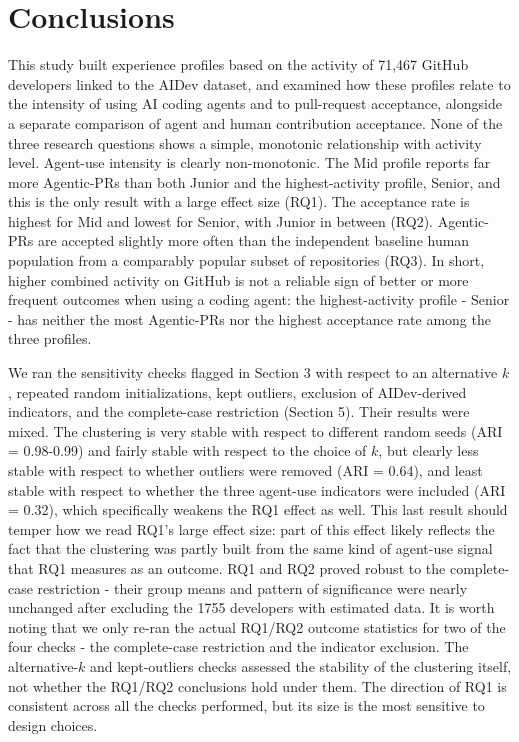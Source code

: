 \section{Conclusions\label{sec:conclusions}}
This study built experience profiles based on the activity of 71,467 GitHub developers linked to the AIDev dataset, and examined how these profiles relate to the intensity of using AI coding agents and to pull-request acceptance, alongside a separate comparison of agent and human contribution acceptance. None of the three research questions shows a simple, monotonic relationship with activity level. Agent-use intensity is clearly non-monotonic. The Mid profile reports far more Agentic-PRs than both Junior and the highest-activity profile, Senior, and this is the only result with a large effect size (RQ1). The acceptance rate is highest for Mid and lowest for Senior, with Junior in between (RQ2). Agentic-PRs are accepted slightly more often than the independent baseline human population from a comparably popular subset of repositories (RQ3). In short, higher combined activity on GitHub is not a reliable sign of better or more frequent outcomes when using a coding agent: the highest-activity profile - Senior - has neither the most Agentic-PRs nor the highest acceptance rate among the three profiles.

We ran the sensitivity checks flagged in Section 3 with respect to an alternative $k$, repeated random initializations, kept outliers, exclusion of AIDev-derived indicators, and the complete-case restriction (Section 5). Their results were mixed. The clustering is very stable with respect to different random seeds (ARI = 0.98-0.99) and fairly stable with respect to the choice of $k$, but clearly less stable with respect to whether outliers were removed (ARI = 0.64), and least stable with respect to whether the three agent-use indicators were included (ARI = 0.32), which specifically weakens the RQ1 effect as well. This last result should temper how we read RQ1's large effect size: part of this effect likely reflects the fact that the clustering was partly built from the same kind of agent-use signal that RQ1 measures as an outcome. RQ1 and RQ2 proved robust to the complete-case restriction - their group means and pattern of significance were nearly unchanged after excluding the 1755 developers with estimated data. It is worth noting that we only re-ran the actual RQ1/RQ2 outcome statistics for two of the four checks - the complete-case restriction and the indicator exclusion. The alternative-$k$ and kept-outliers checks assessed the stability of the clustering itself, not whether the RQ1/RQ2 conclusions hold under them. The direction of RQ1 is consistent across all the checks performed, but its size is the most sensitive to design choices.

